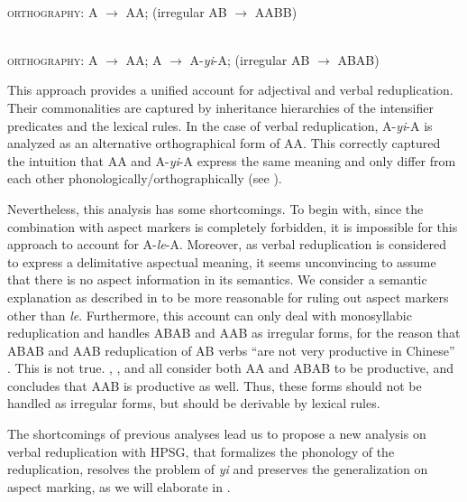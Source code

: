 \ea\label{avm:fsb-redup-a}
\\
\textsc{orthography}: A $\to$ AA; (irregular AB $\to$ AABB)
\z

\ea\label{avm:fsb-redup-v}
\\
\textsc{orthography}: A $\to$ AA; A $\to$ A-\textit{yi}-A; (irregular AB $\to$ ABAB)
\z

This approach provides a unified account for adjectival and verbal reduplication.
Their commonalities are captured by inheritance hierarchies of the intensifier predicates and the lexical rules.
In the case of verbal reduplication, A-\textit{yi}-A is analyzed as an alternative orthographical form of AA.
This correctly captured the intuition that AA and A-\textit{yi}-A express the same meaning and only differ from each other phonologically/orthographically (see ).

Nevertheless, this analysis has some shortcomings.
To begin with, since the combination with aspect markers is completely forbidden, it is impossible for this approach to account for A\hyp{}\textit{le}\hyp{}A.
Moreover, as verbal reduplication is  considered to express a delimitative aspectual meaning,
it seems unconvincing to assume that there is no aspect information in its semantics.
We consider a semantic explanation as described in   to be more reasonable for ruling out aspect markers other than \textit{le}.
Furthermore, this account can only deal with monosyllabic reduplication and handles ABAB and AAB as irregular forms, for the reason that ABAB and AAB reduplication of AB verbs ``are not very productive in Chinese'' \citep[102]{FanSongBond2015}.
This is not true. 
\citet[33]{Xing2000stat}, \citet[161]{BascianoMelloni2017}, \citet[329]{MelloniBasciano2018} and  \citet[Sec.\,3.1]{Xie2020}  all consider both AA and ABAB to be productive,
and \citet[36]{Xing2000stat} concludes that AAB is productive as well.
Thus, these forms should not be handled as  irregular forms, but should be derivable by lexical rules.


 
 


The shortcomings of previous analyses lead us to propose a new analysis on verbal reduplication with {HPSG}, 
that formalizes the phonology of the reduplication, resolves the problem of \textit{yi} and preserves the generalization on aspect marking, 
as we will elaborate in . 

